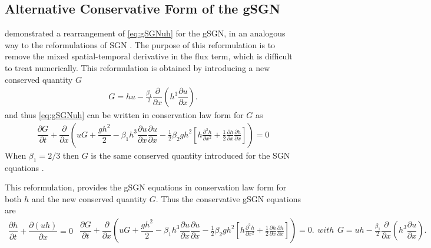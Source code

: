 \documentclass[10pt]{elsarticle}
\begin{document}
\subsection{Alternative Conservative Form of the gSGN}
\citet{Clamond-Dutykh-2018-237} demonstrated a rearrangement of \eqref{eq:gSGNuh} for the gSGN, in an analogous way to the reformulations of SGN \cite{Hank-etal-2010-2034,Li-2014-169,Zoppou-etal-2017}. The purpose of this reformulation is to remove the mixed spatial-temporal derivative in the flux term, which is difficult to treat numerically. This reformulation is obtained by introducing a new conserved quantity $G$
\begin{gather*}
G = hu - \frac{\beta_1}{2} \dfrac{\partial }{\partial x} \left ( h^3 \dfrac{\partial u}{\partial x} \right ).
\end{gather*}
and thus \eqref{eq:gSGNuh} can be written in conservation law form for $G$ as
\begin{gather*}\label{eq:G_momentum}
\dfrac{\partial G }{\partial t}  + \dfrac{\partial}{\partial x} \left ( uG + \dfrac{gh^2}{2} - \beta_1 h^3\dfrac{\partial u}{\partial x}\dfrac{\partial u}{\partial x}  - \frac{1}{2} \beta_2 g h^2  \left[h\frac{\partial^2 h}{\partial x^2} + \frac{1}{2}\frac{\partial h}{\partial x}\frac{\partial h}{\partial x}\right]\right ) = 0
\end{gather*}
When $\beta_1 = 2/3$ then $G$ is the same conserved quantity introduced for the SGN equations \cite{Hank-etal-2010-2034,Li-2014-169,Zoppou-etal-2017}.

This reformulation, provides the gSGN equations in conservation law form for both $h$ and the new conserved quantity $G$. Thus the conservative gSGN equations are
\begin{subequations}
\begin{gather}
\dfrac{\partial h}{\partial t} + \dfrac{\partial (uh)}{\partial x} = 0
\label{eq:gSGN_Gh}
\end{gather}
\begin{gather}
\dfrac{\partial G }{\partial t}  + \dfrac{\partial}{\partial x} \left ( uG + \dfrac{gh^2}{2} - \beta_1 h^3\dfrac{\partial u}{\partial x}\dfrac{\partial u}{\partial x}  - \frac{1}{2} \beta_2 g h^2  \left[h\frac{\partial^2 h}{\partial x^2} + \frac{1}{2}\frac{\partial h}{\partial x}\frac{\partial h}{\partial x}\right]\right ) = 0.
\label{eq:gSGN_GG}
\end{gather}
with
\begin{gather}\label{eq:G_divergent}
G = uh - \frac{\beta_1}{2}\dfrac{\partial }{\partial x} \left ( h^3 \dfrac{\partial u}{\partial x} \right ).
\end{gather}
\label{eq:gSGN_G}
\end{subequations}
\end{document}
